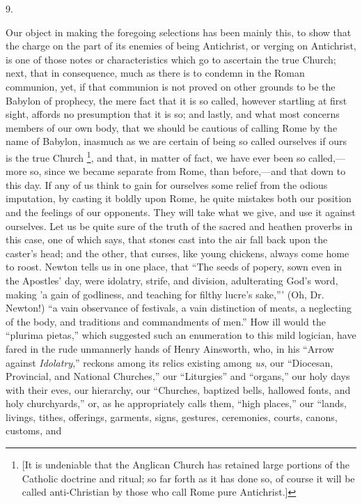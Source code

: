 9.

Our object in making the foregoing selections has been mainly this,
to show that the charge on the part of its enemies of being
Antichrist, or verging on Antichrist, is one of those notes or
characteristics which go to ascertain the true Church; next,
that in consequence, much as there is to condemn in the Roman
communion, yet, if that communion is not proved on other grounds to be
the Babylon of prophecy, the mere fact that it is so called, however
startling at first sight, affords no presumption that it is so; and
lastly, and what most concerns members of our own body, that we should
be cautious of calling Rome by the name of Babylon, inasmuch as we are
certain of being so called ourselves if ours is the true Church \footnote{[It is
undeniable that the Anglican Church has retained large portions of the
Catholic doctrine and ritual; so far forth as it has done so, of
course it will be called anti-Christian by those who call Rome pure
Antichrist.]}, and that, in matter of fact, we have ever been so called,—more
so, since we became separate from Rome, than before,—and that down
to this day. If any of us think to gain for ourselves some relief from
the odious imputation, by casting it boldly upon Rome, he quite
mistakes both our position and the feelings of our opponents. They
will take what we give, and use it against ourselves. Let us be quite
sure of the truth of the sacred and heathen proverbs in this case, one
of which says, that stones cast into the air fall back upon the caster's
head; and the other, that curses, like young chickens, always come
home to roost. Newton tells us in one place, that ``The seeds of
popery, sown even in the Apostles' day, were idolatry, strife, and
division, adulterating God's word, making 'a gain of godliness, and
teaching for filthy lucre's sake,''' (Oh, Dr. Newton!) ``a
vain observance of festivals, a vain distinction of meats, a
neglecting of the body, and traditions and commandments of men.''
How ill would the ``plurima pietas,'' which suggested such an
enumeration to this mild logician, have fared in the rude unmannerly
hands of Henry Ainsworth, who, in his ``Arrow against \emph{Idolatry},''
reckons among its relics existing among \emph{us}, our
``Diocesan, Provincial, and National Churches,'' our
``Liturgies'' and ``organs,'' our holy days with their
eves, our hierarchy, our ``Churches, baptized bells, hallowed
fonts, and holy churchyards,'' or, as he appropriately calls them,
``high places,'' our ``lands, livings, tithes, offerings,
garments, signs, gestures, ceremonies, courts, canons, customs, and

